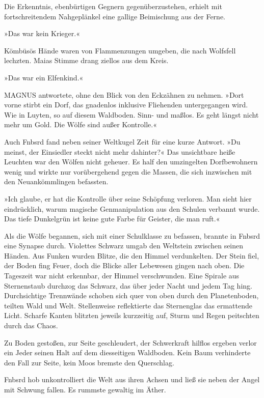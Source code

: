 Die Erkenntnis, ebenbürtigen Gegnern gegenüberzustehen, erhielt mit fortschreitendem Nahgeplänkel eine gallige Beimischung aus der Ferne.

»Das war kein Krieger.«

Kömbüsös Hände waren von Flammenzungen umgeben, die nach Wolfsfell lechzten. Maias Stimme drang ziellos aus dem Kreis.

»Das war ein Elfenkind.«

MAGNUS antwortete, ohne den Blick von den Eckzähnen zu nehmen. »Dort vorne stirbt ein Dorf, das gnadenlos inklusive Fliehenden untergegangen wird. Wie in Luyten, so auf diesem Waldboden. Sinn- und maßlos. Es geht längst nicht mehr um Gold. Die Wölfe sind außer Kontrolle.«

Auch Fnbsrd fand neben seiner Weltkugel Zeit für eine kurze Antwort. »Du meinst, der Einsiedler steckt nicht mehr dahinter?« Das unsichtbare heiße Leuchten war den Wölfen nicht geheuer. Es half den umzingelten Dorfbewohnern wenig und wirkte nur vorübergehend gegen die Massen, die sich inzwischen mit den Neuankömmlingen befassten.

»Ich glaube, er hat die Kontrolle über seine Schöpfung verloren. Man sieht hier eindrücklich, warum magische Genmanipulation aus den Schulen verbannt wurde. Das tiefe Dunkelgrün ist keine gute Farbe für Geister, die man ruft.«

Als die Wölfe begannen, sich mit einer Schulklasse zu befassen, brannte in Fnbsrd eine Synapse durch. Violettes Schwarz umgab den Weltstein zwischen seinen Händen. Aus Funken wurden Blitze, die den Himmel verdunkelten. Der Stein fiel, der Boden fing Feuer, doch die Blicke aller Lebewesen gingen nach oben. Die Tageszeit war nicht erkennbar, der Himmel verschwunden. Eine Spirale aus Sternenstaub durchzog das Schwarz, das über jeder Nacht und jedem Tag hing. Durchsichtige Trennwände schoben sich quer von oben durch den Planetenboden, teilten Wald und Welt. Stellenweise reflektierte das Sternenglas das ermattende Licht. Scharfe Kanten blitzten jeweils kurzzeitig auf, Sturm und Regen peitschten durch das Chaos.

Zu Boden gestoßen, zur Seite geschleudert, der Schwerkraft hilflos ergeben verlor ein Jeder seinen Halt auf dem diesseitigen Waldboden. Kein Baum verhinderte den Fall zur Seite, kein Moos bremste den Querschlag.

Fnbsrd hob unkontrolliert die Welt aus ihren Achsen und ließ sie neben der Angel mit Schwung fallen. Es rummste gewaltig im Äther.

